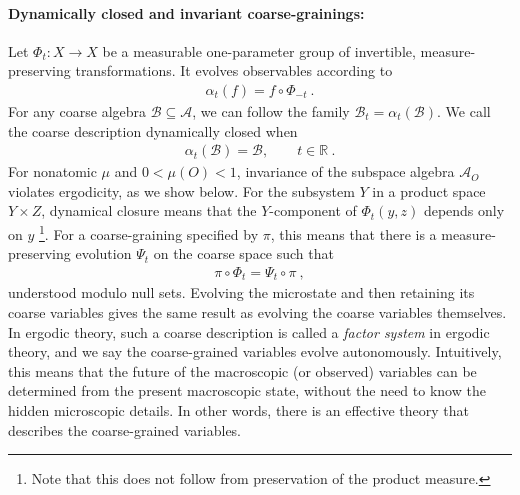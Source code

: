 \documentclass[a4paper,11pt]{article}
\theoremstyle{definition}
\newcommand{\mA}{\mathcal{A}}
\newcommand{\mB}{\mathcal{B}}
\begin{document}
\paragraph{Dynamically closed and invariant coarse-grainings:}
Let $\Phi_t:X\to X$ be a measurable one-parameter group of invertible, measure-preserving transformations. It evolves observables according to
\begin{align}
    \alpha_t(f)=f\circ\Phi_{-t}\ .
\end{align}
For any coarse algebra $\mB\subseteq\mA$, we can follow the family $\mB_t=\alpha_t(\mB)$. We call the coarse description dynamically closed when
\begin{align}\label{eq:classical-coarse-invariance}
    \alpha_t(\mB)=\mB,\qquad t\in\mathbb R\ .
\end{align}
For nonatomic $\mu$ and $0<\mu(O)<1$, invariance of the subspace algebra $\mA_O$ violates ergodicity, as we show below.
For the subsystem $Y$ in a product space $Y\times Z$, dynamical closure means that the $Y$-component of $\Phi_t(y,z)$ depends only on $y$ \footnote{Note that this does not follow from preservation of the product measure.}. For a coarse-graining specified by $\pi$, this means that there is a measure-preserving evolution $\Psi_t$ on the coarse space such that
\begin{align}\label{eq:classical-factor-intertwining}
    \pi\circ\Phi_t=\Psi_t\circ\pi\ ,
\end{align}
understood modulo null sets. Evolving the microstate and then retaining its coarse variables gives the same result as evolving the coarse variables themselves. In ergodic theory, such a coarse description is called a {\it factor system} in ergodic theory, and we say the coarse-grained variables evolve autonomously. Intuitively, this means that the future of the macroscopic (or observed) variables can be determined from the present macroscopic state, without the need to know the hidden microscopic details. In other words, there is an effective theory that describes the coarse-grained variables.


\end{document}
